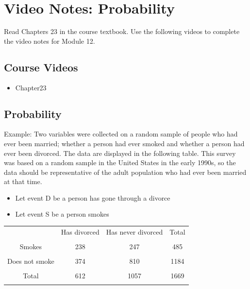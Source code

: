 \documentclass[
]{report}
\providecommand{\tightlist}{%
  \setlength{\itemsep}{0pt}\setlength{\parskip}{0pt}}
\begin{document}
\newpage

\section{Video Notes: Probability}\label{video-notes-probability}

Read Chapters 23 in the course textbook. Use the following videos to complete the video notes for Module 12.

\subsection{Course Videos}\label{course-videos-1}

\begin{itemize}
\tightlist
\item
  Chapter23
\end{itemize}


\subsection*{Probability}\label{probability-1}

Example: Two variables were collected on a random sample of people who had ever been married; whether a person had ever smoked and whether a person had ever been divorced. The data are displayed in the following table. This survey was based on a random sample in the United States in the early 1990s, so the data should be representative of the adult population who had ever been married at that time.

\begin{itemize}
\item
  Let event D be a person has gone through a divorce
\item
  Let event S be a person smokes
\end{itemize}

\begin{center}
\begin{tabular}{|c|c|c|c|} \hline
\hspace{0.8in} & \hspace{0.35in} Has divorced \hspace{.35in} & \hspace{0.35in} Has never divorced  \hspace{0.35in} & \hspace{0.3in} Total \hspace{0.3in} \\ 
& & & \\ \hline
Smokes & 238 & 247 & 485 \\ 
& & & \\ \hline
Does not smoke & 374 & 810 & 1184 \\ 
& & & \\ \hline
Total & 612 & 1057 & 1669 \\ 
& & & \\ \hline
\end{tabular}
\end{center}
\vspace{.1in}
\end{document}
